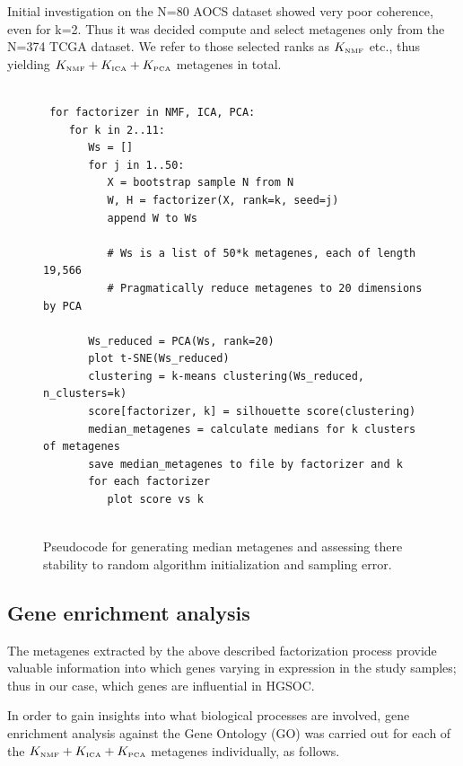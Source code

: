 \documentclass[draft, tikz, 12pt,a4paper,oneside,fleqn]{article}
\begin{document}
Initial investigation on the N=80 AOCS dataset showed very poor coherence, even for k=2.   Thus it was decided compute and select metagenes only from the N=374 TCGA dataset.   We refer to those selected ranks as $K_{\mbox{\tiny NMF}}$ etc., thus yielding $K_{\mbox{\tiny NMF}} + K_{\mbox{\tiny ICA}} + K_{\mbox{\tiny PCA}}$ metagenes in total.

\begin{figure}
\begin{center}
\begin{Verbatim}[baselinestretch=1, frame=single, rulecolor=\color{blue}, label=Metagene Stability Assessment, fontfamily=courier, fontsize=\small]

 for factorizer in NMF, ICA, PCA:
    for k in 2..11:
       Ws = []
       for j in 1..50:
          X = bootstrap sample N from N
          W, H = factorizer(X, rank=k, seed=j)
          append W to Ws
   	     
          # Ws is a list of 50*k metagenes, each of length 19,566
          # Pragmatically reduce metagenes to 20 dimensions by PCA
   	  
       Ws_reduced = PCA(Ws, rank=20)
       plot t-SNE(Ws_reduced)
       clustering = k-means clustering(Ws_reduced, n_clusters=k)
       score[factorizer, k] = silhouette score(clustering)	  
       median_metagenes = calculate medians for k clusters of metagenes
       save median_metagenes to file by factorizer and k
       for each factorizer 
          plot score vs k
      
\end{Verbatim}
\end{center}
\caption{Pseudocode for generating median metagenes and assessing there stability to random algorithm initialization and sampling error.}
\label{fig-clustering-psuedocode}
\end{figure}
	   	  
\subsection{Gene enrichment analysis}

The metagenes extracted by the above described factorization process provide valuable information into which genes varying in expression in the study samples; thus in our case, which genes are influential in HGSOC.  

In order to gain insights into what biological processes are involved, gene enrichment analysis against the Gene Ontology (GO) was carried out for each of the $K_{\mbox{\tiny NMF}} + K_{\mbox{\tiny ICA}} + K_{\mbox{\tiny PCA}}$ metagenes individually, as follows.
\end{document}
